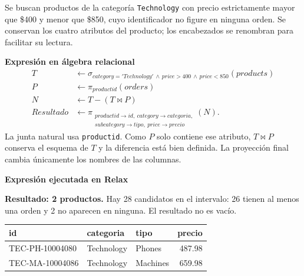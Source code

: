Se buscan productos de la categoría \texttt{Technology} con precio estrictamente mayor que \$400 y menor que \$850, cuyo identificador no figure en ninguna orden. Se conservan los cuatro atributos del producto; los encabezados se renombran para facilitar su lectura.

\textbf{Expresión en álgebra relacional}
\begin{align*}
T &\leftarrow \sigma_{category='Technology'\,\land\,price>400\,\land\,price<850}(products)\\
P &\leftarrow \pi_{productid}(orders)\\
N &\leftarrow T-(T\bowtie P)\\
Resultado &\leftarrow \pi_{\substack{productid\to id,\ category\to categoria,\\subcategory\to tipo,\ price\to precio}}(N).
\end{align*}
La junta natural usa \texttt{productid}. Como $P$ solo contiene ese atributo, $T\bowtie P$ conserva el esquema de $T$ y la diferencia está bien definida. La proyección final cambia únicamente los nombres de las columnas.

\textbf{Expresión ejecutada en Relax}

\textbf{Resultado: 2 productos.} Hay 28 candidatos en el intervalo: 26 tienen al menos una orden y 2 no aparecen en ninguna. El resultado no es vacío.
\begin{center}\small\begin{tabular}{lllr}\toprule\rowcolor{Fondo}
id & categoria & tipo & precio\\\midrule
TEC-PH-10004080 & Technology & Phones & 487.98\\
TEC-MA-10004086 & Technology & Machines & 659.98\\\bottomrule
\end{tabular}\end{center}

\clearpage
